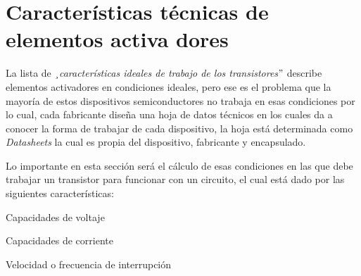 \documentclass[12pt]{article}
\begin{document}

\setlength{\parskip}{15.96pt}
\par


\vspace{\baselineskip}

\vspace{\baselineskip}

\vspace{\baselineskip}

\vspace{\baselineskip}

\vspace{\baselineskip}
\setlength{\parskip}{8.16pt}
\section{Características técnicas de elementos activa dores}
\setlength{\parskip}{8.04pt}
La lista de \textit{¸características ideales de trabajo de los transistores$"$  }describe elementos activadores en condiciones ideales, pero ese es el problema que la mayoría de estos dispositivos semiconductores no trabaja en esas condiciones por lo cual, cada fabricante diseña una hoja de datos técnicos en los cuales da a conocer la forma de trabajar de cada dispositivo, la hoja está determinada como \textit{Datasheets }la cual es propia del dispositivo, fabricante y encapsulado.\par

\setlength{\parskip}{11.52pt}
Lo importante en esta sección será el cálculo de esas condiciones en las que debe trabajar un transistor para funcionar con un circuito, el cual está dado por las siguientes características:\par

\setlength{\parskip}{8.52pt}
\begin{adjustwidth}{0.25in}{0.0in}
Capacidades de voltaje\par

\end{adjustwidth}

\begin{adjustwidth}{0.25in}{0.0in}
Capacidades de corriente\par

\end{adjustwidth}

\setlength{\parskip}{33.96pt}
\begin{adjustwidth}{0.25in}{0.0in}
Velocidad o frecuencia de interrupción\par

\end{adjustwidth}
\end{document}
